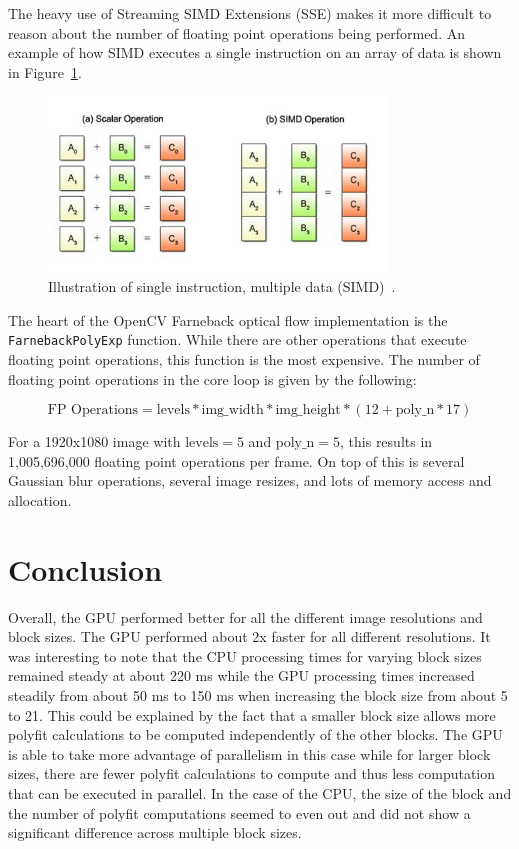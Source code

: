 \documentclass[12pt,letterpaper]{article}
\begin{document}
The heavy use of Streaming SIMD Extensions (SSE) makes it more difficult to
reason about the number of floating point operations being performed. An
example of how SIMD executes a single instruction on an array of data is shown
in Figure~\ref{fig:simd}.

\begin{figure}[h]
  \centering
    \includegraphics[width=0.8\textwidth]{img/simd.jpg}
  \caption{Illustration of single instruction, multiple data (SIMD)~\cite{simd}.}
  \label{fig:simd}
\end{figure}

The heart of the OpenCV Farneback optical flow implementation is the
\texttt{FarnebackPolyExp} function. While there are other operations that
execute floating point operations, this function is the most expensive. The
number of floating point operations in the core loop is given by the following:

$$
\text{FP Operations} = \text{levels} * \text{img\_width} * \text{img\_height}
                * (12 + \text{poly\_n} * 17)
$$

For a 1920x1080 image with $\text{levels}=5$ and $\text{poly\_n}=5$, this results in
1,005,696,000 floating point operations per frame. On top of this is several
Gaussian blur operations, several image resizes, and lots of memory access and
allocation.

\section{Conclusion}
Overall, the GPU performed better for all the different image resolutions and
block sizes. The GPU performed about 2x faster for all different resolutions.
It was interesting to note that the CPU processing times for varying block
sizes remained steady at about 220 ms while the GPU processing times
increased steadily from about 50 ms to 150 ms when increasing the block size
from about 5 to 21. This could be explained by the fact that a smaller block
size allows more polyfit calculations to be computed independently of the other
blocks. The GPU is able to take more advantage of parallelism in this case
while for larger block sizes, there are fewer polyfit calculations to compute
and thus less computation that can be executed in parallel. In the case of the
CPU, the size of the block and the number of polyfit computations seemed to
even out and did not show a significant difference across multiple block sizes.
\end{document}
